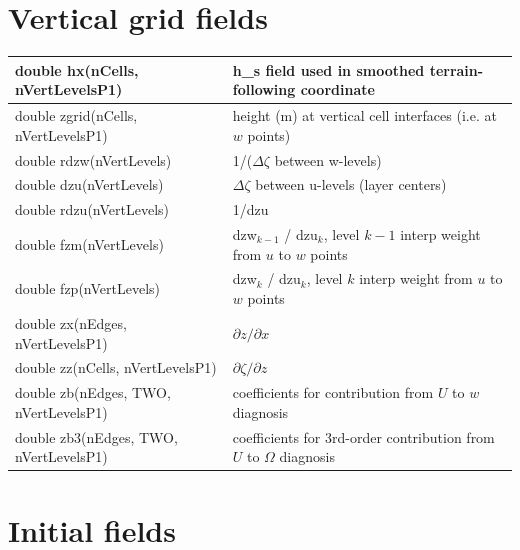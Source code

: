 \documentclass[11pt]{report}
\begin{document}
\section{Vertical grid fields}

{\small        
\begin{longtable}{|p{2.5in} |p{3.75in}|}
 \hline
        double hx(nCells, nVertLevelsP1)     & h\_s field used in smoothed terrain-following coordinate \\ \hline
        double zgrid(nCells, nVertLevelsP1)  & height (m) at vertical cell interfaces (i.e. at $w$ points) \\ \hline
        double rdzw(nVertLevels)                & 1/($\Delta \zeta$ between w-levels) \\ \hline
        double dzu(nVertLevels)                 & $\Delta \zeta$ between u-levels (layer centers) \\ \hline
        double rdzu(nVertLevels)                & 1/dzu \\ \hline
        double fzm(nVertLevels)                 & dzw$_{k-1}$ / dzu$_k$, level $k-1$ interp weight from \hfil \break $u$ to $w$ points \\ \hline
        double fzp(nVertLevels)                 & dzw$_k$ / dzu$_k$, level $k$ interp weight from $u$ to $w$ points \\ \hline
        double zx(nEdges, nVertLevelsP1)        & $\partial z / \partial x$ \\ \hline
        double zz(nCells, nVertLevelsP1)        & $\partial \zeta / \partial z$ \\ \hline
        double \hfil\break zb(nEdges, TWO, nVertLevelsP1)   & coefficients for contribution from $U$ to $w$ diagnosis \\ \hline
        double \hfil\break zb3(nEdges, TWO, nVertLevelsP1)  & coefficients for 3rd-order contribution from $U$ to $\Omega$ \hfil\break diagnosis \\ \hline
\end{longtable}
}
   
\newpage        
\section{Initial fields}  
\end{document}
